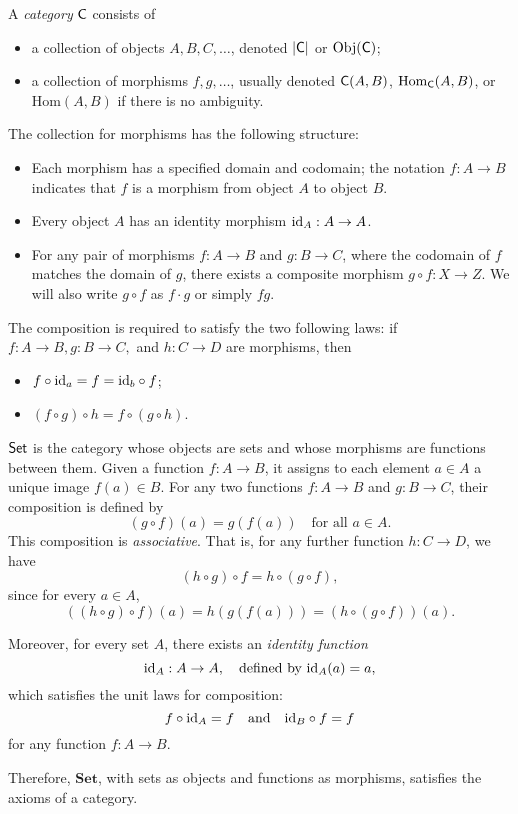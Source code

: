 \begin{definition}
   A \emph{category} $\mathsf{C}$ consists of
   \begin{itemize}
    \item a collection of objects $A, B, C, \ldots$, denoted $|\mathsf{C}|$ or $\text{Obj}(\mathsf{C})$;
    \item a collection of morphisms $f, g, \ldots $, usually denoted $\mathsf{C}(A,B)$, $\mathrm{Hom}_{\mathsf{C}}(A,B)$, or $\mathrm{Hom}(A,B)$ if there is no ambiguity. 
   \end{itemize}
    The collection for morphisms has the following structure:
    \begin{itemize}
      \item Each morphism has a specified domain and codomain; the notation $ f : A \to B $ indicates that $ f $ is a morphism from object $ A $ to object $ B $.  
       \item Every object $ A $ has an identity morphism $ \mathrm{id}_A : A \to A $.  
      \item For any pair of morphisms $ f : A \to B $ and $ g : B \to C $, where the codomain of $ f $ matches the domain of $ g $, there exists a composite morphism $ g \circ f : X \to Z $. We will also write $g \circ f$ as $f \cdot g$ or simply $f g$.
    \end{itemize}

     The composition is required to satisfy the two following laws: if $f : A \to B, g : B \to C,$ and $h:C \to D$ are morphisms, then
     \begin{itemize}
      \item  $f \circ \mathrm{id}_a = f = \mathrm{id}_b \circ f$;
      \item  $  (f \circ g) \circ h = f \circ (g \circ h) $.
     \end{itemize}
\end{definition}





\begin{example}
 $\mathsf{Set}$ is the category whose objects are sets and whose  morphisms are functions between them. Given a function \(f: A \to B\), it assigns to each element \(a \in A\) a unique image \(f(a) \in B\). 
 For any two functions \(f: A \to B\) and \(g: B \to C\), their composition is defined by
$$
(g \circ f)(a) = g(f(a)) \quad \text{for all } a \in A.
$$
This composition is \emph{associative}. That is, for any further function \(h: C \to D\), we have
\[
(h \circ g) \circ f = h \circ (g \circ f),
\]
since for every \(a \in A\),
\[
((h \circ g) \circ f)(a) = h(g(f(a))) = (h \circ (g \circ f))(a).
\]

Moreover, for every set \(A\), there exists an \emph{identity function}
\[
\mathrm{id}_A : A \to A, \quad \text{defined by } \mathrm{id}_A(a) = a,
\]
which satisfies the unit laws for composition:
\[
f \circ \mathrm{id}_A = f \quad \text{and} \quad \mathrm{id}_B \circ f = f
\]
for any function \(f: A \to B\).

Therefore, \(\mathbf{Set}\), with sets as objects and functions as morphisms, satisfies the axioms of a category.
\end{example}

